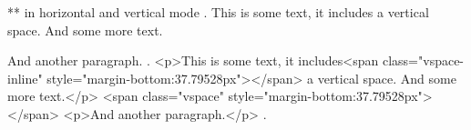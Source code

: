 ** \vspace{} in horizontal and vertical mode
.
This is some text, it includes\vspace{1cm} a vertical space. And some more text.

\vspace{1cm}
And another paragraph.
.
<p>This is some text, it includes<span class="vspace-inline" style="margin-bottom:37.79528px"></span> a vertical space. And some more text.</p>
<span class="vspace" style="margin-bottom:37.79528px"></span>
<p>And another paragraph.</p>
.

